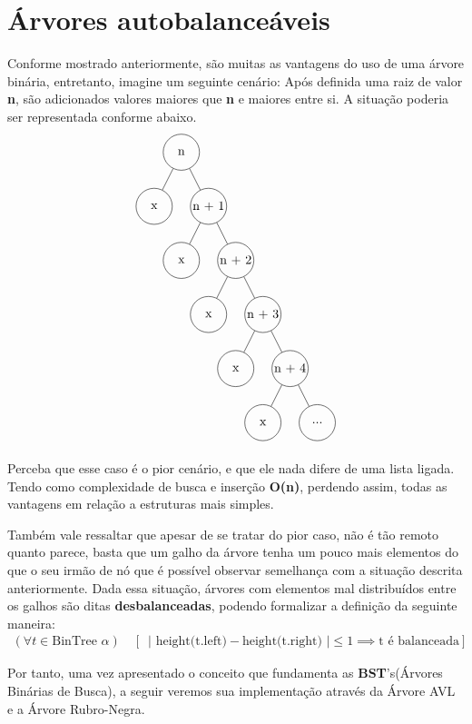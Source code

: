 \chapter{Árvores autobalanceáveis}
\label{ch:auto_bal} %

%
Conforme mostrado anteriormente, são muitas as vantagens do uso de uma árvore binária, entretanto, imagine um seguinte cenário: Após definida uma raiz de valor \textbf{n}, são adicionados valores maiores que \textbf{n} e maiores entre si. A situação poderia ser representada conforme abaixo.
\begin{align*}
	\begin{tikzpicture}[
			every node/.style={circle, draw, minimum size=1.0cm, inner sep=0},
		]
		\node {n}
		child {node {x}}
		child {node {n + 1}
				child {node {x}}
				child {node {n + 2}
						child {node {x}}
						child {node {n + 3}
								child {node {x}}
								child {node {n + 4}
										child {node {x}}
										child {node {...}}}}}};
	\end{tikzpicture}
\end{align*}

Perceba que esse caso é o pior cenário, e que ele nada difere de uma lista ligada. Tendo como complexidade de busca e inserção \textbf{O(n)}, perdendo assim, todas as vantagens em relação a estruturas mais simples.

Também vale ressaltar que apesar de se tratar do pior caso, não é tão remoto quanto parece, basta que um galho da árvore tenha um pouco mais elementos do que o seu irmão de nó que é possível observar semelhança com a situação descrita anteriormente. Dada essa situação, árvores com elementos mal distribuídos entre os galhos são ditas \textbf{desbalanceadas}, podendo formalizar a definição da seguinte maneira:
\begin{align*}
	(\forall t \in \text{BinTree } \alpha) \quad
	\left[ \, \text{ | height(t.left)} - \text{height(t.right) |} \leq 1 \implies \text{t é balanceada} \right]
\end{align*}

Por tanto, uma vez apresentado o conceito que fundamenta as \textbf{BST}'s(Árvores Binárias de Busca), a seguir veremos sua implementação através da Árvore AVL e a Árvore Rubro-Negra.


\newpage


\newpage
